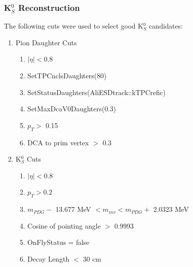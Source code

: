 \subsubsection{\texorpdfstring{K$^{0}_{S}$}{TEXT} Reconstruction}
\label{K0sReconstruction}

The following cuts were used to select good K$^{0}_{S}$ candidates:

\begin{enumerate}
 \item{Pion Daughter Cuts}
 \begin{enumerate}
  \item $|\eta| < 0.8$
  \item SetTPCnclsDaughters(80)
  \item SetStatusDaughters(AliESDtrack::kTPCrefic)
  \item SetMaxDcaV0Daughters(0.3)
  \item $p_{T} >$ 0.15
  \item DCA to prim vertex $>$ 0.3
 \end{enumerate}

 \item K$^{0}_{S}$ Cuts
 \begin{enumerate}
  \item $|\eta| < 0.8$
  \item $p_{T} > 0.2$
  \item $m_{PDG} -$ 13.677 MeV $< m_{inv} < m_{PDG} +$ 2.0323 MeV
  \item Cosine of pointing angle $>$ 0.9993
  \item OnFlyStatus = false
  \item Decay Length $<$ 30 cm
 \end{enumerate}  
 
\end{enumerate}

